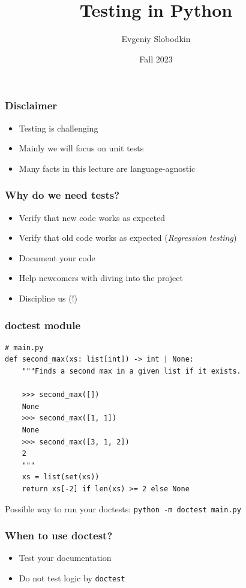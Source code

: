 \documentclass[compress]{beamer}
\title{Testing in Python}
\author{Evgeniy Slobodkin}
\institute{ITMO Univeristy}
\date{Fall 2023}
\begin{document}
\frame{\titlepage}


\begin{frame}
\frametitle{Disclaimer}

\begin{itemize}
    \item<1-> Testing is challenging
    \item<2-> Mainly we will focus on unit tests
    \item<3-> Many facts in this lecture are language-agnostic
\end{itemize}

\end{frame}


\begin{frame}
\frametitle{Why do we need tests?}

\begin{itemize}
  \item<1-> Verify that new code works as expected
  \item<2-> Verify that old code works as expected (\textit{Regression testing})
  \item<3-> Document your code
  \item<4-> Help newcomers with diving into the project
  \item<5-> Discipline us (!)
\end{itemize}

\end{frame}


\begin{frame}[fragile]
\frametitle{doctest module\footnotemark[1]}

\begin{verbatim}
# main.py
def second_max(xs: list[int]) -> int | None:
    """Finds a second max in a given list if it exists.

    >>> second_max([])
    None
    >>> second_max([1, 1])
    None
    >>> second_max([3, 1, 2])
    2
    """
    xs = list(set(xs))
    return xs[-2] if len(xs) >= 2 else None
\end{verbatim}

\vspace{0.3in}

Possible way to run your doctests: \texttt{python -m doctest main.py}

\end{frame}


\begin{frame}[fragile]
\frametitle{When to use doctest?}

\begin{itemize}
    \item Test your documentation
    \item Do not test logic by \texttt{doctest}
\end{itemize}

\end{frame}
\end{document}
